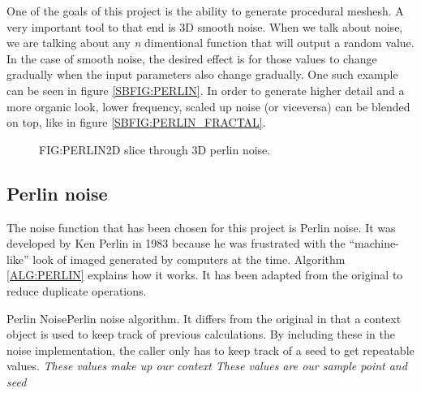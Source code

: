 One of the goals of this project is the ability to generate procedural meshesh.
A very important tool to that end is 3D smooth noise.
When we talk about noise,
we are talking about any \textit{n} dimentional function that will output a random value.
In the case of smooth noise,
the desired effect is for those values to change gradually when the input parameters also change gradually.
One such example can be seen in figure \ref{SBFIG:PERLIN}.
In order to generate higher detail and a more organic look,
lower frequency, scaled up noise (or viceversa) can be blended on top,
like in figure \ref{SBFIG:PERLIN_FRACTAL}.

\begin{figure}[Perlin noise example]{FIG:PERLIN}{2D slice through 3D perlin noise.}
\end{figure}

\subsection{Perlin noise}

The noise function that has been chosen for this project is Perlin noise.
It was developed by Ken Perlin in 1983 because he was frustrated with the ``machine-like'' look of imaged generated by computers at the time.
Algorithm \ref{ALG:PERLIN} explains how it works.
It has been adapted from the original to reduce duplicate operations.

\begin{algorithmN}{Perlin Noise}{Perlin noise algorithm. It differs from the original in that a context object is used to keep track of previous calculations. By including these in the noise implementation, the caller only has to keep track of a seed to get repeatable values.}
  \emph{These values make up our context}\;
  \emph{These values are our sample point and seed}\;
\end{algorithmN}
